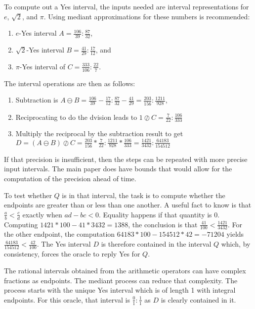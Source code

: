 \documentclass[12pt]{article}
\theoremstyle{remark}
\begin{document}
To compute out a Yes interval, the inputs needed are interval representations for $e$, $\sqrt{2}$, and $\pi$. Using mediant approximations for these numbers is recommended: 
\begin{enumerate}
\item $e$-Yes interval $A  = \frac{106}{39}: \frac{87}{32}$,
\item $\sqrt{2}$-Yes interval $B = \frac{41}{29}: \frac{17}{12}$, and
\item $\pi$-Yes interval of $C= \frac{333}{106}: \frac{22}{7}$.
\end{enumerate}
The interval operations are then as follows:
\begin{enumerate}
\item Subtraction is $A\ominus B = \frac{106}{39} - \frac{17}{12}: \frac{87}{32} - \frac{41}{29} = \frac{203}{156}: \frac{1211}{928}$,
\item Reciprocating to do the dvision leads to  $1\oslash C = \frac{7}{22}: \frac{106}{333}$
\item Multiply the reciprocal by the subtraction result to get $D = (A\ominus B)\oslash C = \frac{203}{156} *\frac{7}{22}: \frac{1211}{928} * \frac{106}{333} = \frac{1421}{3432}: \frac{64183}{154512}$
\end{enumerate}
If that precision is insufficient, then the steps can be repeated with more precise input intervals. The main paper does have bounds that would allow for the computation of the precision ahead of time. 

To test whether $Q$ is in that interval, the task is to compute whether the endpoints are greater than or less than one another. A useful fact to know is that $\frac{a}{b} < \frac{c}{d}$ exactly when $ad - bc < 0$. Equality happens if that quantity is 0. Computing $1421*100 - 41*3432 = 1388$, the conclusion is that $\frac{41}{100} < \frac{1421}{3432}$. For the other endpoint, the computation $64183*100 - 154512*42 = -71204$ yields $ \frac{64183}{154512} < \frac{42}{100}$. The Yes interval $D$ is therefore contained in the interval $Q$ which, by consistency, forces the oracle to reply Yes for $Q$. 

The rational intervals obtained from the arithmetic operators can have complex fractions as endpoints. The mediant process can reduce that complexity. The process starts with the unique Yes interval which is of length 1 with integral endpoints. For this oracle, that interval is $\frac{0}{1}:\frac{1}{1}$ as $D$ is clearly contained in it. 
\end{document}
